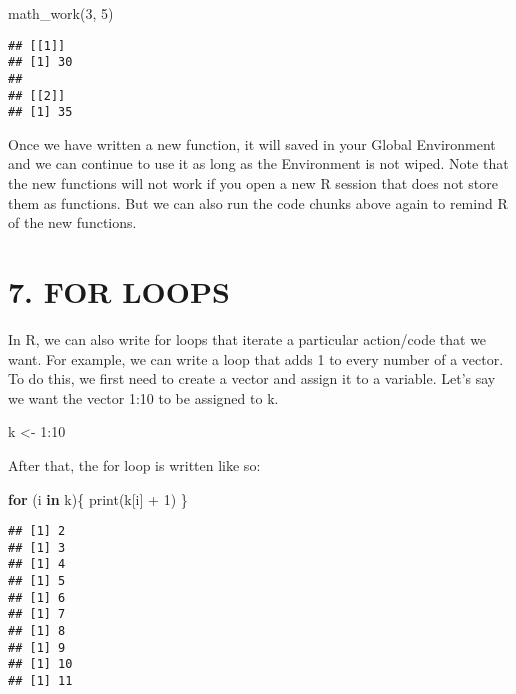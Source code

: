 \documentclass[
]{book}
\newenvironment{Shaded}{\begin{snugshade}}{\end{snugshade}}
\newcommand{\ControlFlowTok}[1]{\textcolor[rgb]{0.13,0.29,0.53}{\textbf{#1}}}
\newcommand{\DecValTok}[1]{\textcolor[rgb]{0.00,0.00,0.81}{#1}}
\newcommand{\FunctionTok}[1]{\textcolor[rgb]{0.00,0.00,0.00}{#1}}
\newcommand{\NormalTok}[1]{#1}
\newcommand{\OtherTok}[1]{\textcolor[rgb]{0.56,0.35,0.01}{#1}}
\newcommand{\SpecialCharTok}[1]{\textcolor[rgb]{0.00,0.00,0.00}{#1}}
\begin{document}
\begin{Shaded}
\begin{Highlighting}[]
\FunctionTok{math\_work}\NormalTok{(}\DecValTok{3}\NormalTok{, }\DecValTok{5}\NormalTok{)}
\end{Highlighting}
\end{Shaded}

\begin{verbatim}
## [[1]]
## [1] 30
## 
## [[2]]
## [1] 35
\end{verbatim}

Once we have written a new function, it will saved in your Global Environment and we can continue to use it as long as the Environment is not wiped. Note that the new functions will not work if you open a new R session that does not store them as functions. But we can also run the code chunks above again to remind R of the new functions.

\hypertarget{for-loops}{%
\section{7. FOR LOOPS}\label{for-loops}}

In R, we can also write for loops that iterate a particular action/code that we want. For example, we can write a loop that adds 1 to every number of a vector. To do this, we first need to create a vector and assign it to a variable. Let's say we want the vector 1:10 to be assigned to k.

\begin{Shaded}
\begin{Highlighting}[]
\NormalTok{k }\OtherTok{\textless{}{-}} \DecValTok{1}\SpecialCharTok{:}\DecValTok{10}
\end{Highlighting}
\end{Shaded}

After that, the for loop is written like so:

\begin{Shaded}
\begin{Highlighting}[]
\ControlFlowTok{for}\NormalTok{ (i }\ControlFlowTok{in}\NormalTok{ k)\{}
  \FunctionTok{print}\NormalTok{(k[i] }\SpecialCharTok{+} \DecValTok{1}\NormalTok{)}
\NormalTok{\}}
\end{Highlighting}
\end{Shaded}

\begin{verbatim}
## [1] 2
## [1] 3
## [1] 4
## [1] 5
## [1] 6
## [1] 7
## [1] 8
## [1] 9
## [1] 10
## [1] 11
\end{verbatim}
\end{document}
